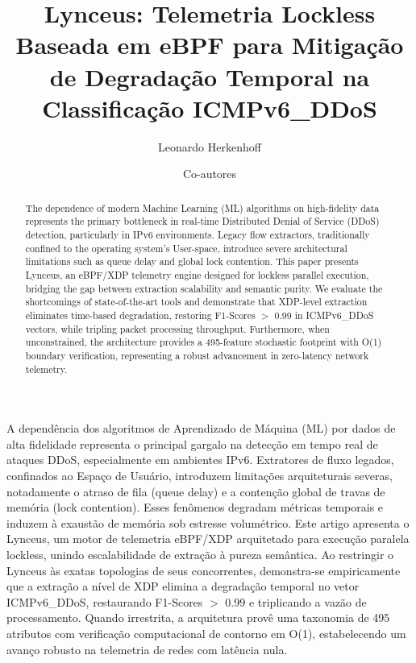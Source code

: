 \documentclass[12pt]{article}
\title{Lynceus: Telemetria Lockless Baseada em eBPF para Mitigação de Degradação Temporal na Classificação ICMPv6\_DDoS}
\author{Leonardo Herkenhoff \and Co-autores}
\begin{document}
\maketitle

\begin{abstract}
The dependence of modern Machine Learning (ML) algorithms on high-fidelity data represents the primary bottleneck in real-time Distributed Denial of Service (DDoS) detection, particularly in IPv6 environments. Legacy flow extractors, traditionally confined to the operating system's User-space, introduce severe architectural limitations such as queue delay and global lock contention. This paper presents Lynceus, an eBPF/XDP telemetry engine designed for lockless parallel execution, bridging the gap between extraction scalability and semantic purity. We evaluate the shortcomings of state-of-the-art tools and demonstrate that XDP-level extraction eliminates time-based degradation, restoring F1-Scores $>$ 0.99 in ICMPv6\_DDoS vectors, while tripling packet processing throughput. Furthermore, when unconstrained, the architecture provides a 495-feature stochastic footprint with O(1) boundary verification, representing a robust advancement in zero-latency network telemetry.
\end{abstract}

\begin{resumo} 
A dependência dos algoritmos de Aprendizado de Máquina (ML) por dados de alta fidelidade representa o principal gargalo na detecção em tempo real de ataques DDoS, especialmente em ambientes IPv6. Extratores de fluxo legados, confinados ao Espaço de Usuário, introduzem limitações arquiteturais severas, notadamente o atraso de fila (queue delay) e a contenção global de travas de memória (lock contention). Esses fenômenos degradam métricas temporais e induzem à exaustão de memória sob estresse volumétrico. Este artigo apresenta o Lynceus, um motor de telemetria eBPF/XDP arquitetado para execução paralela lockless, unindo escalabilidade de extração à pureza semântica. Ao restringir o Lynceus às exatas topologias de seus concorrentes, demonstra-se empiricamente que a extração a nível de XDP elimina a degradação temporal no vetor ICMPv6\_DDoS, restaurando F1-Scores $>$ 0.99 e triplicando a vazão de processamento. Quando irrestrita, a arquitetura provê uma taxonomia de 495 atributos com verificação computacional de contorno em O(1), estabelecendo um avanço robusto na telemetria de redes com latência nula.
\end{resumo}
\end{document}
